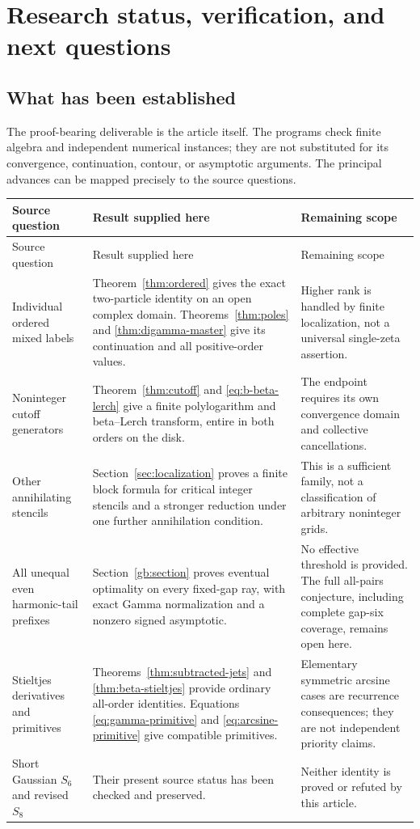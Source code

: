 \section{Research status, verification, and next questions}
\label{sec:audit}

\subsection{What has been established}

The proof-bearing deliverable is the article itself. The programs
check finite algebra and independent numerical instances; they are
not substituted for its convergence, continuation, contour, or
asymptotic arguments. The principal advances can be mapped precisely
to the source questions.

\begin{longtable}{@{}>{\raggedright\arraybackslash}p{}>{\raggedright\arraybackslash}p{}>{\raggedright\arraybackslash}p{}@{}}
\toprule
Source question & Result supplied here & Remaining scope\\
\midrule
\endfirsthead
\toprule
Source question & Result supplied here & Remaining scope\\
\midrule
\endhead
Individual ordered mixed labels &
Theorem~\ref{thm:ordered} gives the exact two-particle identity on an
open complex domain. Theorems~\ref{thm:poles} and
\ref{thm:digamma-master} give its continuation and all positive-order
values. &
Higher rank is handled by finite localization, not a universal
single-zeta assertion.\\[5pt]
Noninteger cutoff generators &
Theorem~\ref{thm:cutoff} and \eqref{eq:b-beta-lerch} give a finite
polylogarithm and beta--Lerch transform, entire in both orders on
the disk. &
The endpoint requires its own convergence domain and collective
cancellations.\\[5pt]
Other annihilating stencils &
Section~\ref{sec:localization} proves a finite block formula for
critical integer stencils and a stronger reduction under one further
annihilation condition. &
This is a sufficient family, not a classification of arbitrary
noninteger grids.\\[5pt]
All unequal even harmonic-tail prefixes &
Section~\ref{gb:section} proves eventual optimality on every fixed-gap
ray, with exact Gamma normalization and a nonzero signed asymptotic. &
No effective threshold is provided. The full all-pairs conjecture,
including complete gap-six coverage, remains open here.\\[5pt]
Stieltjes derivatives and primitives &
Theorems~\ref{thm:subtracted-jets} and \ref{thm:beta-stieltjes}
provide ordinary all-order identities. Equations
\eqref{eq:gamma-primitive} and \eqref{eq:arcsine-primitive}
give compatible primitives. &
Elementary symmetric arcsine cases are recurrence consequences;
they are not independent priority claims.\\[5pt]
Short Gaussian $S_6$ and revised $S_8$ &
Their present source status has been checked and preserved. &
Neither identity is proved or refuted by this article.\\
\bottomrule
\end{longtable}

